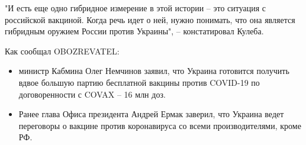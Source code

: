 "И есть еще одно гибридное измерение в этой истории – это ситуация с российской
вакциной. Когда речь идет о ней, нужно понимать, что она является гибридным
оружием России против Украины", – констатировал Кулеба.

Как сообщал OBOZREVATEL:

\begin{itemize}
\item министр Кабмина Олег Немчинов заявил, что Украина готовится получить
				вдвое большую партию бесплатной вакцины против COVID-19  по
				договоренности с COVAX – 16 млн доз.

\item Ранее глава Офиса президента Андрей Ермак заверил, что Украина ведет
				переговоры о вакцине против коронавируса со всеми производителями,
				кроме РФ.
\end{itemize}
